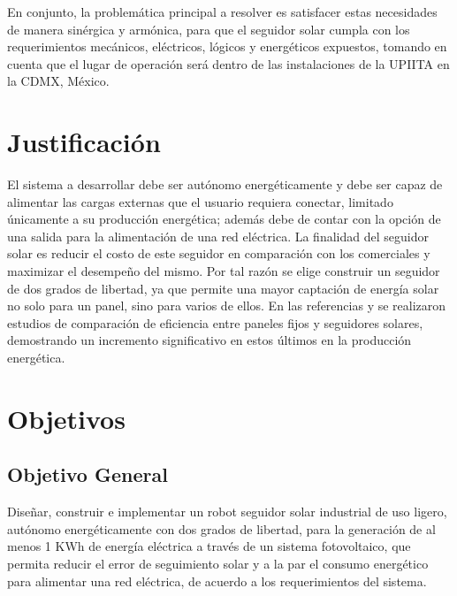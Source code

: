 En conjunto, la problemática principal a resolver es satisfacer estas necesidades de manera sinérgica y armónica, para que el seguidor solar cumpla con los requerimientos mecánicos, eléctricos, lógicos y energéticos expuestos, tomando en cuenta que el lugar de operación será dentro de las instalaciones de la UPIITA en la CDMX, México. 
\newpage
\section{Justificación}
El sistema a desarrollar debe ser autónomo energéticamente y debe ser capaz de alimentar las cargas externas que el usuario requiera conectar, limitado únicamente a su producción energética; además debe de contar con la opción de una salida para la alimentación de una red eléctrica. La finalidad del seguidor solar es reducir el costo de este seguidor en comparación con los comerciales y maximizar el desempeño del mismo. Por tal razón se elige construir un seguidor de dos grados de libertad, ya que permite una mayor captación de energía solar no solo para un panel, sino para varios de ellos. En las referencias \cite{I12} y \cite{I13} se realizaron estudios de comparación de eficiencia entre paneles fijos y seguidores solares, demostrando un incremento significativo en estos últimos en la producción energética. \\



\newpage
\section{Objetivos}
\subsection{Objetivo General}
Diseñar, construir e implementar un robot seguidor solar industrial de uso ligero, autónomo energéticamente con dos grados de libertad, para la generación de al menos 1 KWh de energía eléctrica a través de un sistema fotovoltaico, que permita reducir el error de seguimiento solar y a la par el consumo energético para alimentar una red eléctrica, de acuerdo a los requerimientos del sistema.
